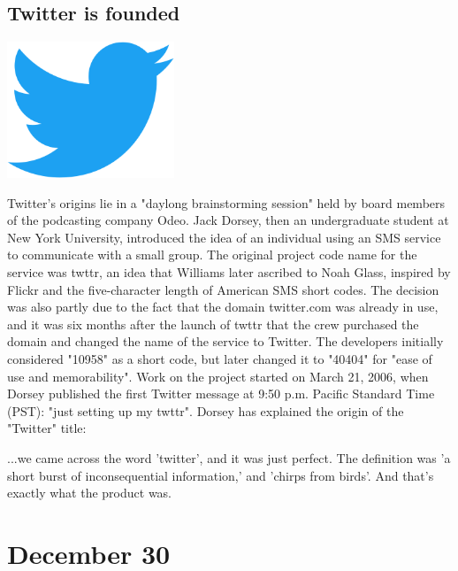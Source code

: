 \documentclass[11pt]{report}
\begin{document}
\subsection{Twitter is founded}
\vspace{2mm}\begin{center}\includegraphics[width=5cm]{./img/twitter.png}\end{center}
Twitter's origins lie in a "daylong brainstorming session" held by board members of the podcasting company Odeo. Jack Dorsey, then an undergraduate student at New York University, introduced the idea of an individual using an SMS service to communicate with a small group. The original project code name for the service was twttr, an idea that Williams later ascribed to Noah Glass, inspired by Flickr and the five-character length of American SMS short codes. The decision was also partly due to the fact that the domain twitter.com was already in use, and it was six months after the launch of twttr that the crew purchased the domain and changed the name of the service to Twitter. The developers initially considered "10958" as a short code, but later changed it to "40404" for "ease of use and memorability". Work on the project started on March 21, 2006, when Dorsey published the first Twitter message at 9:50 p.m. Pacific Standard Time (PST): "just setting up my twttr". Dorsey has explained the origin of the "Twitter" title:

...we came across the word 'twitter', and it was just perfect. The definition was 'a short burst of inconsequential information,' and 'chirps from birds'. And that's exactly what the product was.

\section{December 30}
\end{document}
